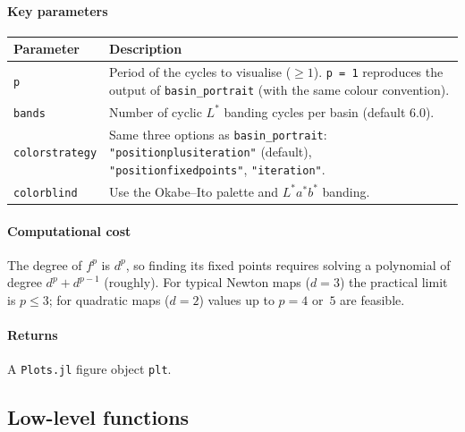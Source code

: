 \documentclass[11pt,a4paper]{article}
\theoremstyle{definition}
\newcommand{\pkg}[1]{\texttt{#1}}
\newcommand{\fn}[1]{\texttt{#1}}
\begin{document}
\paragraph{Key parameters}

\begin{center}
\renewcommand{\arraystretch}{1.25}
\begin{tabular}{lp{8.8cm}}
\toprule
Parameter & Description \\
\midrule
\texttt{p} &
  Period of the cycles to visualise ($\geq 1$).  \texttt{p = 1} reproduces
  the output of \fn{basin\_portrait} (with the same colour convention).\\
\texttt{bands} &
  Number of cyclic $L^*$ banding cycles per basin (default $6.0$).\\
\texttt{colorstrategy} &
  Same three options as \fn{basin\_portrait}: \texttt{"positionplusiteration"}
  (default), \texttt{"positionfixedpoints"}, \texttt{"iteration"}.\\
\texttt{colorblind} &
  Use the Okabe--Ito palette and $L^*a^*b^*$ banding.\\
\bottomrule
\end{tabular}
\end{center}

\paragraph{Computational cost}
The degree of $f^p$ is $d^p$, so finding its fixed points requires
solving a polynomial of degree $d^p + d^{p-1}$ (roughly).  For typical
Newton maps ($d = 3$) the practical limit is $p \leq 3$; for quadratic
maps ($d = 2$) values up to $p = 4$ or~$5$ are feasible.

\paragraph{Returns}
A \pkg{Plots.jl} figure object \texttt{plt}.

\subsection{Low-level functions}
\label{sec:lowlevel}
\end{document}
